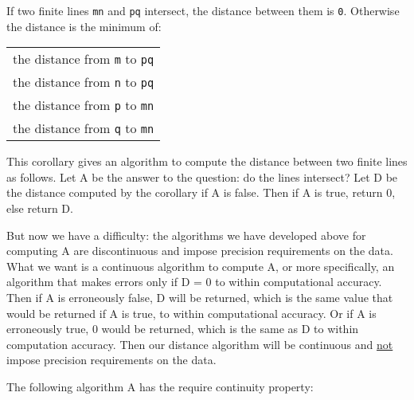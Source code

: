 \documentclass[12pt]{article}
\begin{document}
\begin{corollary}
If two finite lines {\tt mn} and {\tt pq} intersect, the distance
between them is {\tt 0}.  Otherwise the distance is the minimum of: \\
\hspace*{0.5in}\begin{tabular}{l}
the distance from {\tt m} to {\tt pq} \\
the distance from {\tt n} to {\tt pq} \\
the distance from {\tt p} to {\tt mn} \\
the distance from {\tt q} to {\tt mn} \\
\end{tabular}
\end{corollary}

This corollary gives an algorithm to compute the distance between
two finite lines as follows.  Let A be the answer to the question:
do the lines intersect?  Let D be the distance computed by the
corollary if A is false.  Then if A is true, return 0, else return D.

But now we have a difficulty: the algorithms we have developed
above for computing A are discontinuous and impose precision
requirements on the data.  What we want is a continuous algorithm 
to compute A,
or more specifically, an algorithm that makes errors only if D = 0
to within computational accuracy.  Then if A is erroneously
false, D will be returned, which is the same value that would be
returned if A is true, to within computational accuracy.  Or if
A is erroneously true, 0 would be returned, which is the same as
D to within computation accuracy.  Then
our distance algorithm will be continuous and \underline{not} impose
precision requirements on the data.

The following algorithm A has the require continuity property:
\end{document}
